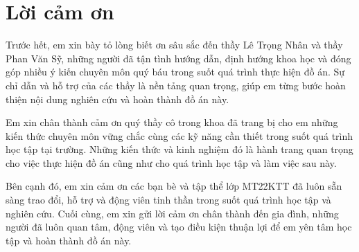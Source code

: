 \chapter*{Lời cảm ơn}

Trước hết, em xin bày tỏ lòng biết ơn sâu sắc đến thầy Lê Trọng Nhân và thầy Phan Văn Sỹ, những người đã tận tình hướng dẫn, định hướng khoa học và đóng góp nhiều ý kiến chuyên môn quý báu trong suốt quá trình thực hiện đồ án. Sự chỉ dẫn và hỗ trợ của các thầy là nền tảng quan trọng, giúp em từng bước hoàn thiện nội dung nghiên cứu và hoàn thành đồ án này.

Em xin chân thành cảm ơn quý thầy cô trong khoa đã trang bị cho em những kiến thức chuyên môn vững chắc cùng các kỹ năng cần thiết trong suốt quá trình học tập tại trường. Những kiến thức và kinh nghiệm đó là hành trang quan trọng cho việc thực hiện đồ án cũng như cho quá trình học tập và làm việc sau này.

Bên cạnh đó, em xin cảm ơn các bạn bè và tập thể lớp MT22KTT đã luôn sẵn sàng trao đổi, hỗ trợ và động viên tinh thần trong suốt quá trình học tập và nghiên cứu. Cuối cùng, em xin gửi lời cảm ơn chân thành đến gia đình, những người đã luôn quan tâm, động viên và tạo điều kiện thuận lợi để em yên tâm học tập và hoàn thành đồ án này.
